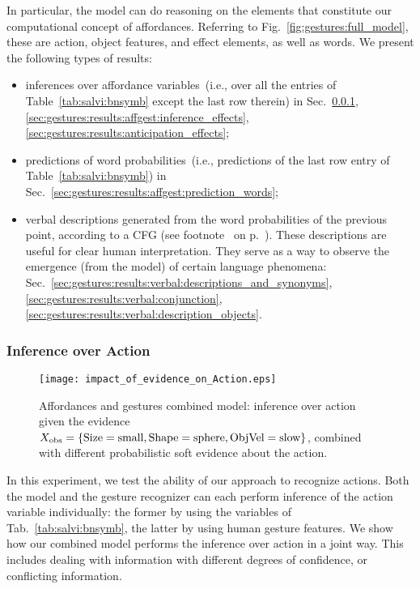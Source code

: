 In particular, the model can do reasoning on the elements that constitute our computational concept of affordances.
Referring to Fig.~\ref{fig:gestures:full_model}, these are action, object features, and effect elements, as well as words.
We present the following types of results:
\begin{itemize}
  \item inferences over affordance variables~(i.e., over all the entries of Table~\ref{tab:salvi:bnsymb} except the last row therein) in Sec.~\ref{sec:gestures:results:affgest:inference_actions}, \ref{sec:gestures:results:affgest:inference_effects}, \ref{sec:gestures:results:anticipation_effects};

  \item predictions of word probabilities~(i.e., predictions of the last row entry of Table~\ref{tab:salvi:bnsymb}) in Sec.~\ref{sec:gestures:results:affgest:prediction_words};

  \item verbal descriptions generated from the word probabilities of the previous point, according to a \ac{CFG} (see footnote~ on p.~\pageref{footnote:cfg}).
  These descriptions are useful for clear human interpretation.
  They serve as a way to observe the emergence (from the model) of certain language phenomena: Sec.~\ref{sec:gestures:results:verbal:descriptions_and_synonyms}, \ref{sec:gestures:results:verbal:conjunction}, \ref{sec:gestures:results:verbal:description_objects}.
\end{itemize}

\subsubsection{Inference over Action}
\label{sec:gestures:results:affgest:inference_actions}

\begin{figure}
\centering
\texttt{[image: impact\_of\_evidence\_on\_Action.eps]}
\caption{Affordances and gestures combined model: inference over action given the evidence $X_\text{obs} =\{\text{Size}=\text{small}, \text{Shape}=\text{sphere}, \text{ObjVel}=\text{slow}\}$, combined with different probabilistic soft evidence about the action.}
\label{fig:impact_of_evidence_on_Action}
\end{figure}

In this experiment, we test the ability of our approach to recognize actions.
Both the \AffWords{} model and the gesture recognizer can each perform inference of the action variable individually: the former by using the variables of Tab.~\ref{tab:salvi:bnsymb}, the latter by using human gesture features.
We show how our combined model performs the inference over action in a joint way.
This includes dealing with information with different degrees of confidence, or conflicting information.

